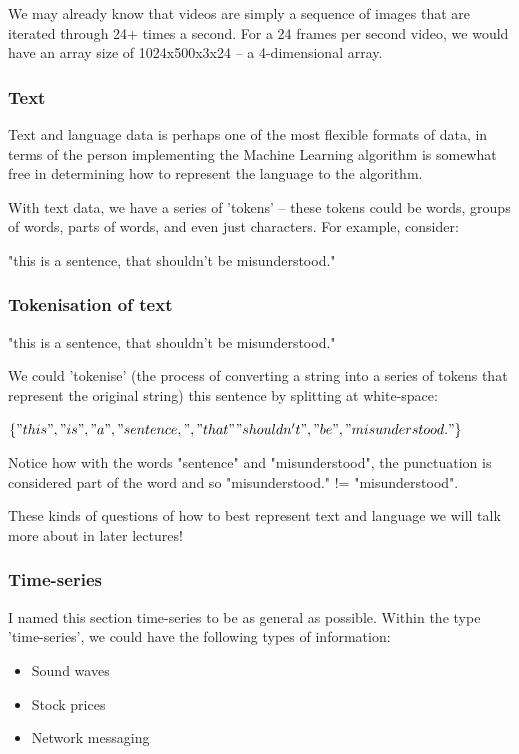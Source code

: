 \documentclass[10pt]{beamer}
\begin{document}
We may already know that videos are simply a sequence of images that are iterated
through 24+ times a second. For a 24 frames per second video, we would have an array
size of 1024x500x3x24 -- a 4-dimensional array.

\subsubsection*{Text}
\label{sec:orgb61727e}

Text and language data is perhaps one of the most flexible formats of data, in terms
of the person implementing the Machine Learning algorithm is somewhat free in
determining how to represent the language to the algorithm.

With text data, we have a series of 'tokens' -- these tokens could be words, groups
of words, parts of words, and even just characters. For example, consider:

"this is a sentence, that shouldn't be misunderstood."

\subsubsection*{Tokenisation of text}
\label{sec:org6384e48}

"this is a sentence, that shouldn't be misunderstood."

We could 'tokenise' (the process of converting a string into a series of tokens that
represent the original string) this sentence by splitting at white-space:

\(\{"this", "is", "a", "sentence,", "that" "shouldn't", "be", "misunderstood."\}\)

Notice how with the words "sentence" and "misunderstood", the punctuation is
considered part of the word and so "misunderstood." != "misunderstood".

These kinds of questions of how to best represent text and language we will talk more
about in later lectures!

\subsubsection*{Time-series}
\label{sec:org50cd778}

I named this section time-series to be as general as possible. Within the type
'time-series', we could have the following types of information:

\begin{itemize}
\item Sound waves
\item Stock prices
\item Network messaging
\end{itemize}
\end{document}
